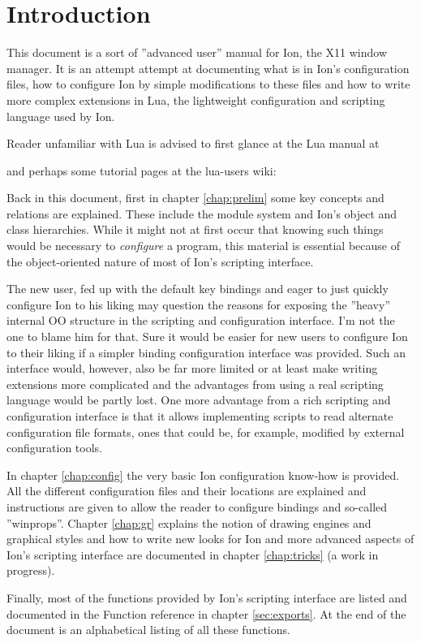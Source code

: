 
\chapter{Introduction}

This document is a sort of ''advanced user'' manual for Ion, the X11
window manager. It is an attempt attempt at documenting what is in Ion's
configuration files, how to configure Ion by simple modifications to these
files and how to write more complex extensions in Lua, the lightweight
configuration and scripting language used by Ion. 

Reader unfamiliar with Lua is advised to first glance at the Lua manual
at 


and perhaps some tutorial pages at the lua-users wiki:


Back in this document, first in chapter \ref{chap:prelim} some key
concepts and relations are explained. These include the module system
and Ion's object and class hierarchies. While it might not at first 
occur that knowing such things would be necessary to \emph{configure} 
a program, this  material is essential because of the object-oriented 
nature of most of Ion's scripting interface.

The new user, fed up with the default key bindings and eager to just
quickly configure Ion to his liking may question the reasons for 
exposing the ''heavy'' internal OO structure in the scripting and
configuration interface. I'm not the one to  blame him for that. 
Sure it would be easier for new users to configure Ion to their liking
if a simpler binding configuration interface was provided. Such an
interface would, however, also be far more limited or at least make 
writing extensions more complicated and the advantages from using a 
real scripting language would be partly lost. One more advantage from
a rich scripting and configuration interface is that it allows 
implementing scripts to read alternate configuration file formats,
ones that could be, for example, modified by external configuration tools. 

In chapter \ref{chap:config} the very basic Ion configuration know-how
is provided. All the different configuration files and their locations
are explained and instructions are given to allow the reader to
configure bindings and so-called ''winprops''. Chapter \ref{chap:gr}
explains the notion of drawing engines and graphical styles and how to
write new looks for Ion and more advanced aspects of Ion's scripting 
interface are documented in chapter \ref{chap:tricks} (a work in 
progress).

Finally, most of the functions provided by Ion's scripting interface
are listed and documented in the Function reference in chapter
\ref{sec:exports}. At the end of the document is an alphabetical
listing of all these functions.


